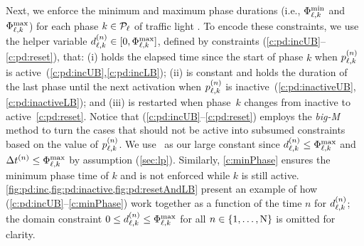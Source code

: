 Next, we enforce the minimum and maximum phase durations (i.e.,
$\PTMIN{\ell}{k}$ and $\PTMAX{\ell}{k}$) for each phase $k \in \Pset_\tl$ of
traffic light \tl.
%
To encode these constraints, we use the helper variable $\pd{\ell}{k} \in
[0,\PTMAX{\ell}{k}]$, defined by constraints
(\ref{c:pd:incUB}--\ref{c:pd:reset}), that:
%
(i) holds the elapsed time since the start of phase $k$ when $\p[n]{\ell}{k}$ is
active~(\ref{c:pd:incUB},\ref{c:pd:incLB});
%
(ii) is constant and holds the duration of the last phase until the next
activation when $\p[n]{\ell}{k}$ is
inactive~(\ref{c:pd:inactiveUB},\ref{c:pd:inactiveLB}); and
%
(iii) is restarted when phase~$k$ changes from inactive to
active~\eqref{c:pd:reset}.
%
Notice that (\ref{c:pd:incUB}--\ref{c:pd:reset}) employs the \textit{big-M}
method to turn the cases that should not be active into subsumed constraints
based on the value of $\p[n]{\tl}{k}$.
%
We use~ as our large constant since $\pd[n]{\ell}{k} \le
\PTMAX{\ell}{k}$ and $\DT[n] \le \PTMAX{\ell}{k}$ by assumption (\cref{sec:lp}).
%
Similarly, \cref{c:minPhase} ensures the minimum phase time of $k$ and is
not enforced while $k$ is still active.
%
\cref{fig:pd:inc,fig:pd:inactive,fig:pd:resetAndLB} present an example of how
(\ref{c:pd:incUB}--\ref{c:minPhase}) work together as a function of the time $n$ 
for $\pd[n]{\ell}{k}$; the domain constraint $0 \le \pd[n]{\ell}{k} \le
\PTMAX{\ell}{k}$ for all $n \in \{1,\dots,\Nn\}$ is omitted for clarity.
%
%
%
